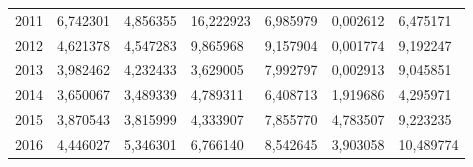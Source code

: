 \begin{table}
\begin{tabular}{p{1cm}p{2cm}p{2cm}p{2cm}p{2cm}p{2cm}p{2cm}}
 2011 &                               6,742301 &                            4,856355 &            16,222923 &                    6,985979 & 0,002612 &           6,475171 \\
 2012 &                               4,621378 &                            4,547283 &             9,865968 &                    9,157904 & 0,001774 &           9,192247 \\
 2013 &                               3,982462 &                            4,232433 &             3,629005 &                    7,992797 & 0,002913 &           9,045851 \\
 2014 &                               3,650067 &                            3,489339 &             4,789311 &                    6,408713 & 1,919686 &           4,295971 \\
 2015 &                               3,870543 &                            3,815999 &             4,333907 &                    7,855770 & 4,783507 &           9,223235 \\
 2016 &                               4,446027 &                            5,346301 &             6,766140 &                    8,542645 & 3,903058 &          10,489774 \\
\bottomrule
\end{tabular}
\end{table}
